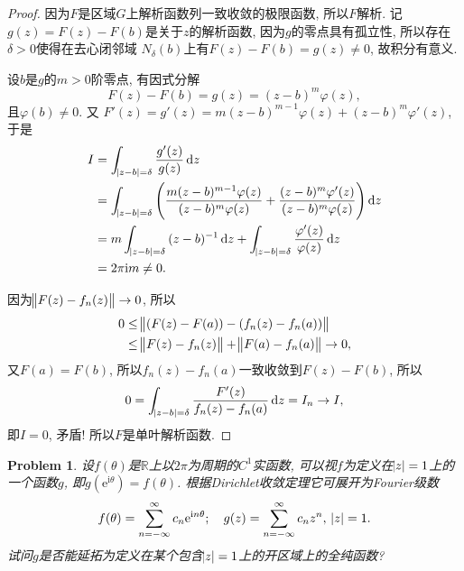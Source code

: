 \documentclass[a4paper, 12pt]{ctexart}
\theoremstyle{plain}
\newtheorem{problem}{Problem}[section]
\theoremstyle{plain}
\theoremstyle{plain}
\theoremstyle{nonumberplain}
\newtheorem{proof}{Proof}
\newcommand*{\BR}{\mathbb{R}}
\newcommand*{\diff}{\mathop{}\!\mathrm{d}}
\newcommand*{\me}{\mathrm{e}}
\newcommand*{\mi}{\mathrm{i}}
\begin{document}
    \begin{proof}
        因为$F$是区域$G$上解析函数列一致收敛的极限函数, 所以$F$解析.
        记$g(z)=F(z)-F(b)$是关于$z$的解析函数, 因为$g$的零点具有孤立性,
        所以存在$\delta>0$使得在去心闭邻域
        $N_{\delta}(b)$上有$F(z)-F(b)=g(z)\neq 0$, 故积分有意义.

        设$b$是$g$的$m>0$阶零点, 有因式分解
        \begin{equation}
            F(z)-F(b)=g(z)=(z-b)^{m}\varphi(z),
        \end{equation}
        且$\varphi(b)\neq 0$. 又
        $F'(z)=g'(z)=m(z-b)^{m-1}\varphi(z)+(z-b)^{m}\varphi'(z)$,
        于是
        \begin{equation}
        \begin{aligned}
            I &= \int_{\abs{z-b}=\delta}{\frac{g'(z)}{g(z)}\diff{z}}\\
            &= \int_{\abs{z-b}=\delta}{\left(
                \frac{m(z-b)^{m-1}\varphi(z)}{(z-b)^{m}\varphi(z)}
                + \frac{(z-b)^{m}\varphi'(z)}{(z-b)^{m}\varphi(z)}\right)
                \diff z}\\
            &= m\int_{\abs{z-b}=\delta}{(z-b)^{-1}\diff z}
              + \int_{\abs{z-b}=\delta}{\frac{\varphi'(z)}{\varphi(z)}\diff z}\\
            &= 2\pi\mi m \neq 0.
        \end{aligned}
        \end{equation}

        因为$\norm{F(z)-f_{n}(z)}\to 0$,
        所以
        \begin{equation}
        \begin{aligned}
            0 &\leq \norm{(F(z)-F(a))-(f_{n}(z)-f_{n}(a))}\\
            &\leq
            \norm{F(z)-f_{n}(z)}+\norm{F(a)-f_{n}(a)} \to 0,
        \end{aligned}
        \end{equation}
        又$F(a)=F(b)$, 所以$f_{n}(z)-f_{n}(a)$一致收敛到$F(z)-F(b)$,
        所以
        \begin{equation}
            0
            =
            \int_{\abs{z-b}=\delta}{\frac{F'(z)}{f_{n}(z)-f_{n}(a)}\diff{z}}
            = I_{n}
            \to I,
        \end{equation}
        即$I=0$, 矛盾! 所以$F$是单叶解析函数.
    \end{proof}

    \begin{problem}
        设$f(\theta)$是$\BR$上以$2\pi$为周期的$C^{1}$实函数,
        可以视$f$为定义在$\abs{z}=1$上的一个函数$g$,
        即$g(\me^{\mi\theta})=f(\theta)$.
        根据Dirichlet收敛定理它可展开为Fourier级数
        \begin{equation}
            f(\theta)=\sum_{n=-\infty}^{\infty}{c_{n}\me^{\mi n\theta}};
            \quad
            g(z)=\sum_{n=-\infty}^{\infty}{c_{n}z^{n}},\ \abs{z}=1.
        \end{equation}
        试问$g$是否能延拓为定义在某个包含$\abs{z}=1$上的开区域上的全纯函数?
    \end{problem}
\end{document}
